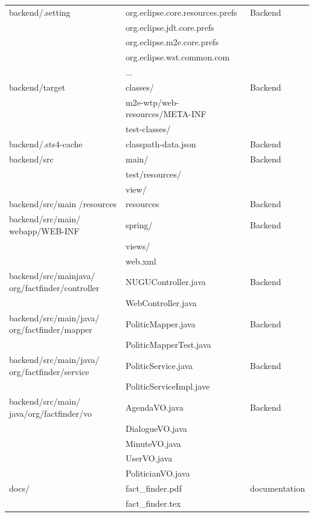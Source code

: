 \documentclass[conference]{IEEEtran}
\begin{document}
 \begin{table}[htbp]
  \renewcommand{\arraystretch}{1.5}
\begin{center}
\begin{tabular}{|p{2.5cm}|p{3.7cm}|p{1.5cm}|}
\hline
backend/.setting& org.eclipse.core.resources.prefs & Backend \\
& org.eclipse.jdt.core.prefs & \\
& org.eclipse.m2e.core.prefs & \\
& org.eclipse.wst.common.com & \\
& ... & \\
\hline

backend/target& classes/ & Backend \\
& m2e-wtp/web-resources/META-INF & \\
& test-classes/ & \\
\hline
backend/.sts4-cache & classpath-data.json & Backend \\
\hline
backend/src& main/ & Backend \\
& test/resources/ & \\
& view/ & \\
\hline
backend/src/main /resources & resources & Backend \\
\hline
backend/src/main/ webapp/WEB-INF& spring/ & Backend \\
 & views/ &\\
& web.xml & \\
\hline
backend/src/mainjava/  org/factfinder/controller& NUGUController.java & Backend \\
& WebController.java & \\

\hline
backend/src/main/java/  org/factfinder/mapper& PoliticMapper.java & Backend \\
& PoliticMapperTest.java & \\
\hline
backend/src/main/java/  org/factfinder/service& PoliticService.java & Backend \\
& PoliticServiceImpl.jave & \\
\hline
backend/src/main/ java/org/factfinder/vo & AgendaVO.java & Backend \\
&DialogueVO.java & \\
&MinuteVO.java & \\
&UserVO.java & \\
&PoliticianVO.java & \\
\hline
docs/ & fact\_finder.pdf & documentation \\
& fact\_finder.tex & \\
\hline
\end{tabular}
\label{tab1}
\end{center}
\end{table}
\end{document}
